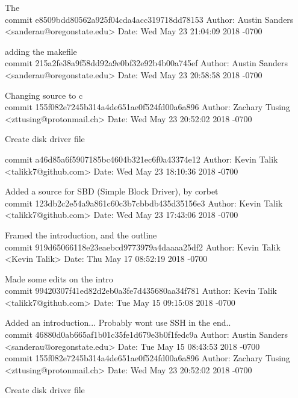 \documentclass[onecolumn, draftclsnofoot,10pt, compsoc]{IEEEtran}
\begin{document}
{    The\\

commit e8509bdd80562a925f04cda4acc319718dd78153
Author: Austin Sanders <sanderau@oregonstate.edu>
Date:   Wed May 23 21:04:09 2018 -0700

    adding the makefile\\

commit 215a2fe38a9f58dd92a9e0bf32e92b4b00a745ef
Author: Austin Sanders <sanderau@oregonstate.edu>
Date:   Wed May 23 20:58:58 2018 -0700

    Changing source to c\\

commit 155f082e7245b314a4de651ae0f524fd00a6a896
Author: Zachary Tusing <zttusing@protonmail.ch>
Date:   Wed May 23 20:52:02 2018 -0700

    Create disk driver file

commit a46d85a6f5907185bc4604b321ec6f0a43374e12
Author: Kevin Talik <talikk7@github.com>
Date:   Wed May 23 18:10:36 2018 -0700

    Added a source for SBD (Simple Block Driver), by corbet\\

commit 123db2c2e54a9a861c60c3b7cbbdb435d35156e3
Author: Kevin Talik <talikk7@github.com>
Date:   Wed May 23 17:43:06 2018 -0700

    Framed the introduction, and the outline\\

commit 919d65066118e23eaebcd9773979a4daaaa25df2
Author: Kevin Talik <Kevin Talik>
Date:   Thu May 17 08:52:19 2018 -0700

    Made some edits on the intro\\

commit 99420307f41ed82d2eb0a3fe7d435680aa34f781
Author: Kevin Talik <talikk7@github.com>
Date:   Tue May 15 09:15:08 2018 -0700

    Added an introduction... Probably wont use SSH in the end..\\

commit 46880d0ab665af1b01c35fe1d679e3b0f1fedc9a
Author: Austin Sanders <sanderau@oregonstate.edu>
Date:   Tue May 15 08:43:53 2018 -0700\\

commit 155f082e7245b314a4de651ae0f524fd00a6a896
Author: Zachary Tusing <zttusing@protonmail.ch>
Date:   Wed May 23 20:52:02 2018 -0700

    Create disk driver file\\

}
\end{document}
